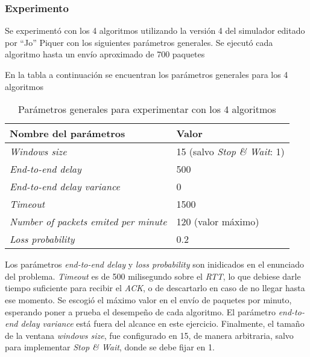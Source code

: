 \documentclass{article}
\begin{document}
\subsubsection{Experimento}
Se experimentó con los 4 algoritmos utilizando la versión 4 del simulador editado por ``Jo'' Piquer\cite{simulador_piquer} con los siguientes parámetros generales. Se ejecutó cada algoritmo hasta un envío aproximado de 700 paquetes

En la tabla a continuación se encuentran los parámetros generales para los 4 algoritmos

\begin{table}
\centering
\caption{Parámetros generales para experimentar con los 4 algoritmos}
\begin{tabular}{ |l|l| } 
 \hline
Nombre del parámetros & Valor\\ \hline
\textit{Windows size} & 15 (salvo \textit{Stop \& Wait}: 1)\\
\textit{End-to-end delay} & 500\\
\textit{End-to-end delay variance} & 0\\
\textit{Timeout} & 1500\\
\textit{Number of packets emited per minute} & 120 (valor máximo)\\
\textit{Loss probability} & 0.2\\ \hline
\end{tabular}
\end{table}

Los parámetros \textit{end-to-end delay} y \textit{loss probability} son inidicados en el enunciado del problema. \textit{Timeout} es de 500 milisegundo sobre el \textit{RTT}, lo que debiese darle tiempo suficiente para recibir el \textit{ACK}, o de descartarlo en caso de no llegar hasta ese momento. Se escogió el máximo valor en el envío de paquetes por minuto, esperando poner a prueba el desempeño de cada algoritmo. El parámetro \textit{end-to-end delay variance} está fuera del alcance en este ejercicio. Finalmente, el tamaño de la ventana \textit{windows size}, fue configurado en 15, de manera arbitraria, salvo para implementar \textit{Stop \& Wait}, donde se debe fijar en 1.
\end{document}

